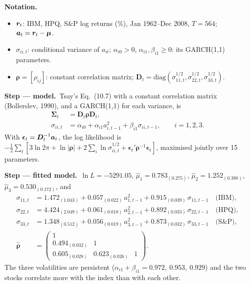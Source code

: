 \documentclass[11pt,a4paper]{article}
\newenvironment{notacao}{\par\smallskip\noindent\textbf{Notation.}\begin{itemize}[leftmargin=1.4em,topsep=1pt,itemsep=0pt]\small}{\end{itemize}}
\newcommand{\passo}[2]{\par\smallskip\noindent\textbf{Step --- #1.}~#2}
\newcommand{\bmu}{\bm{\mu}}\newcommand{\bphi}{\bm{\phi}}\newcommand{\bSigma}{\bm{\Sigma}}
\begin{document}
\begin{sol}
\begin{notacao}
\item $\bm{r}_t$: IBM, HPQ, S\&P log returns (\%), Jan 1962--Dec 2008, $T=564$; $\ba_t=\br_t-\bmu$.
\item $\sigma_{ii,t}$: conditional variance of $a_{it}$; $\alpha_{i0}>0$, $\alpha_{i1},\beta_{i1}\ge0$: its GARCH(1,1) parameters.
\item $\bm\rho=[\rho_{ij}]$: constant correlation matrix; $\bm D_t=\mathrm{diag}(\sigma_{11,t}^{1/2},\sigma_{22,t}^{1/2},\sigma_{33,t}^{1/2})$.
\end{notacao}

\passo{model}{Tsay's Eq.~(10.7) with a constant correlation matrix (Bollerslev, 1990), and a GARCH(1,1)
for each variance, is
\begin{align}
\bSigma_t&=\bm D_t\bm\rho\bm D_t,\label{eq:q9ccc}\\
\sigma_{ii,t}&=\alpha_{i0}+\alpha_{i1}a_{i,t-1}^2+\beta_{i1}\sigma_{ii,t-1},\qquad i=1,2,3.\label{eq:q9g}
\end{align}
With $\bm\epsilon_t=\bm D_t^{-1}\bm{a}_t$, the log likelihood is
$-\tfrac12\sum_t[3\ln2\pi+\ln|\bm\rho|+2\sum_i\ln\sigma_{ii,t}^{1/2}+\bm\epsilon_t'\bm\rho^{-1}\bm\epsilon_t]$,
maximised jointly over 15 parameters.}

\passo{fitted model}{$\ln L=-5291.05$, $\hat\mu_1=0.783_{(0.275)}$, $\hat\mu_2=1.252_{(0.380)}$, $\hat\mu_3=0.530_{(0.172)}$, and
\begin{align}
\sigma_{11,t}&=1.472_{(1.043)}+0.057_{(0.022)}\,a_{1,t-1}^2+0.915_{(0.039)}\,\sigma_{11,t-1}\quad\text{(IBM)},\nonumber\\
\sigma_{22,t}&=4.424_{(2.049)}+0.061_{(0.018)}\,a_{2,t-1}^2+0.892_{(0.033)}\,\sigma_{22,t-1}\quad\text{(HPQ)},\nonumber\\
\sigma_{33,t}&=1.348_{(0.512)}+0.056_{(0.019)}\,a_{3,t-1}^2+0.873_{(0.032)}\,\sigma_{33,t-1}\quad\text{(S\&P)},\nonumber\\
\hat{\bm\rho}&=\begin{pmatrix}1&&\\0.494_{(0.032)}&1&\\0.605_{(0.028)}&0.623_{(0.026)}&1\end{pmatrix}.\nonumber
\end{align}
The three volatilities are persistent ($\alpha_{i1}+\beta_{i1}=0.972,\ 0.953,\ 0.929$) and the two stocks
correlate more with the index than with each other.}


\end{sol}
\end{document}
